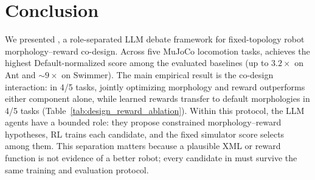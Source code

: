 \section{Conclusion}
\label{sec:conclusion}

We presented \method{}, a role-separated LLM debate framework for fixed-topology robot morphology--reward co-design. Across five MuJoCo locomotion tasks, \abbrev{} achieves the highest Default-normalized score among the evaluated baselines (up to $3.2\times$ on Ant and ${\sim}9\times$ on Swimmer). The main empirical result is the co-design interaction: in 4/5 tasks, jointly optimizing morphology and reward outperforms either component alone, while learned rewards transfer to default morphologies in 4/5 tasks (Table~\ref{tab:design_reward_ablation}). Within this protocol, the LLM agents have a bounded role: they propose constrained morphology--reward hypotheses, RL trains each candidate, and the fixed simulator score selects among them. This separation matters because a plausible XML or reward function is not evidence of a better robot; every candidate in \abbrev{} must survive the same training and evaluation protocol.
